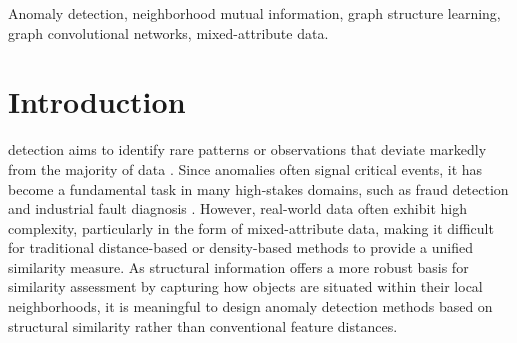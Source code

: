 \documentclass[lettersize,journal]{IEEEtran}
\begin{document}
\begin{IEEEkeywords}
Anomaly detection, neighborhood mutual information, graph structure learning, graph convolutional networks, mixed-attribute data.
\end{IEEEkeywords}

\section{Introduction}
 detection aims to identify rare patterns or observations that deviate markedly
from the majority of data \cite{ref1,ref2}. Since anomalies often signal critical events, it has become
a fundamental task in many high-stakes domains, such as fraud detection and industrial fault diagnosis
\cite{ref3,ref4}. However, real-world data often exhibit high complexity, particularly in the form of
mixed-attribute data, making it difficult for traditional distance-based or density-based methods to
provide a unified similarity measure. As structural information offers a more robust basis for similarity
assessment by capturing how objects are situated within their local neighborhoods, it is meaningful to
design anomaly detection methods based on structural similarity rather than conventional feature distances.
\end{document}

